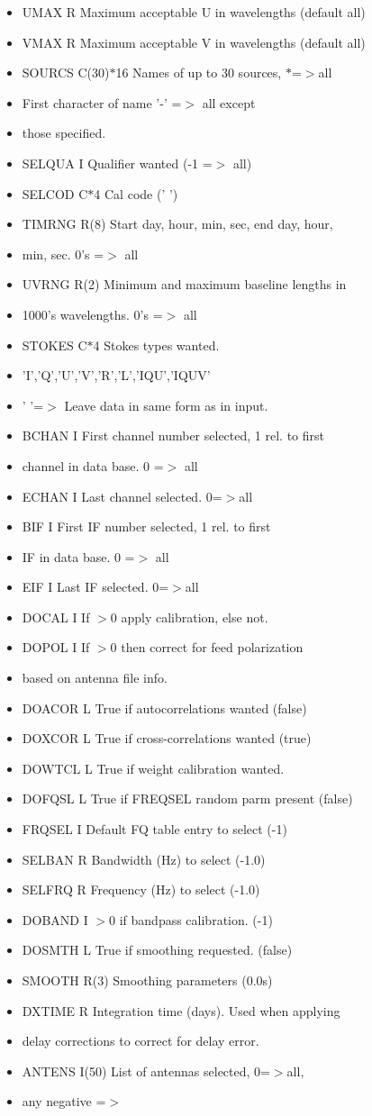 \begin{Desc}
\begin{description}
\begin{itemize}
\item UMAX R Maximum acceptable U in wavelengths (default all) \item VMAX R Maximum acceptable V in wavelengths (default all) \item SOURCS C(30)$\ast$16 Names of up to 30 sources, $\ast$=$>$all \item First character of name '-' =$>$ all except \item those specified. \item SELQUA I Qualifier wanted (-1 =$>$ all) \item SELCOD C$\ast$4 Cal code (' ') \item TIMRNG R(8) Start day, hour, min, sec, end day, hour, \item min, sec. 0's =$>$ all \item UVRNG R(2) Minimum and maximum baseline lengths in \item 1000's wavelengths. 0's =$>$ all \item STOKES C$\ast$4 Stokes types wanted. \item 'I','Q','U','V','R','L','IQU','IQUV' \item ' '=$>$ Leave data in same form as in input. \item BCHAN I First channel number selected, 1 rel. to first \item channel in data base. 0 =$>$ all \item ECHAN I Last channel selected. 0=$>$all \item BIF I First IF number selected, 1 rel. to first \item IF in data base. 0 =$>$ all \item EIF I Last IF selected. 0=$>$all \item DOCAL I If $>$0 apply calibration, else not. \item DOPOL I If $>$0 then correct for feed polarization \item based on antenna file info. \item DOACOR L True if autocorrelations wanted (false) \item DOXCOR L True if cross-correlations wanted (true) \item DOWTCL L True if weight calibration wanted. \item DOFQSL L True if FREQSEL random parm present (false) \item FRQSEL I Default FQ table entry to select (-1) \item SELBAN R Bandwidth (Hz) to select (-1.0) \item SELFRQ R Frequency (Hz) to select (-1.0) \item DOBAND I $>$0 if bandpass calibration. (-1) \item DOSMTH L True if smoothing requested. (false) \item SMOOTH R(3) Smoothing parameters (0.0s) \item DXTIME R Integration time (days). Used when applying \item delay corrections to correct for delay error. \item ANTENS I(50) List of antennas selected, 0=$>$all, \item any negative =$>$ 
\end{itemize}
\end{description}
\end{Desc}
